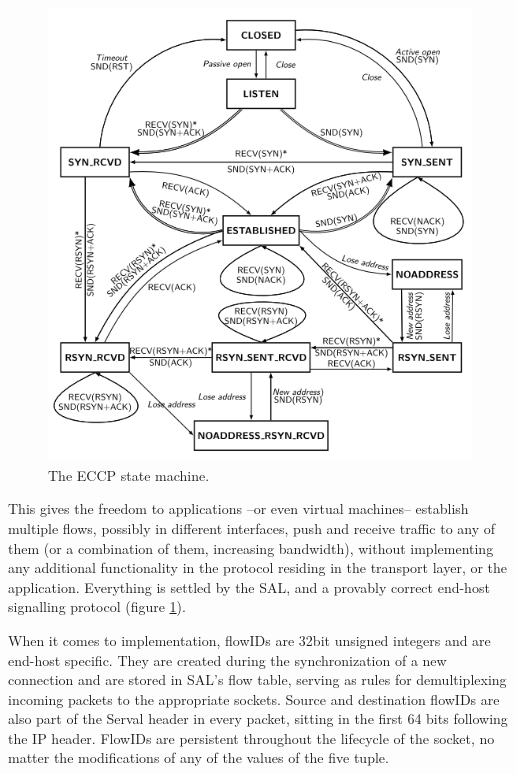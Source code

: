 \begin{figure}
\centering
{}
\includegraphics[scale=0.6]{figures/ECCP_sm}
\caption[The ECCP state machine]{The ECCP \cite{Arye2012} state machine.}
\label{fig:EECP_sm}
\end{figure}

This gives the freedom to applications --or even virtual machines-- establish multiple flows, possibly in different interfaces, push and receive traffic to any of them (or a combination of them, increasing bandwidth), without implementing any additional functionality in the protocol residing in the transport layer, or the application.
Everything is settled by the SAL, and a provably correct end-host signalling protocol (figure \ref{fig:EECP_sm}).

When it comes to implementation, flowIDs are 32bit unsigned integers and are end-host specific.
They are created during the synchronization of a new connection and are stored in SAL's flow table, serving as rules for demultiplexing incoming packets to the appropriate sockets.
Source and destination flowIDs are also part of the Serval header in every packet, sitting in the first 64 bits following the IP header.
FlowIDs are persistent throughout the lifecycle of the socket, no matter the modifications of any of the values of the five tuple.
